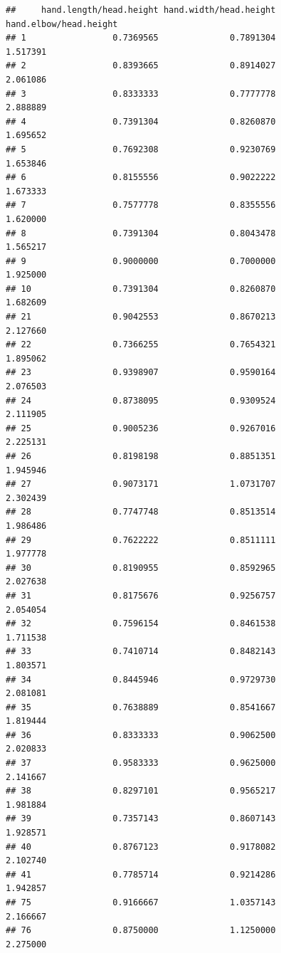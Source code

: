 \documentclass[]{article}
\begin{document}
\begin{verbatim}
##     hand.length/head.height hand.width/head.height hand.elbow/head.height
## 1                 0.7369565              0.7891304               1.517391
## 2                 0.8393665              0.8914027               2.061086
## 3                 0.8333333              0.7777778               2.888889
## 4                 0.7391304              0.8260870               1.695652
## 5                 0.7692308              0.9230769               1.653846
## 6                 0.8155556              0.9022222               1.673333
## 7                 0.7577778              0.8355556               1.620000
## 8                 0.7391304              0.8043478               1.565217
## 9                 0.9000000              0.7000000               1.925000
## 10                0.7391304              0.8260870               1.682609
## 21                0.9042553              0.8670213               2.127660
## 22                0.7366255              0.7654321               1.895062
## 23                0.9398907              0.9590164               2.076503
## 24                0.8738095              0.9309524               2.111905
## 25                0.9005236              0.9267016               2.225131
## 26                0.8198198              0.8851351               1.945946
## 27                0.9073171              1.0731707               2.302439
## 28                0.7747748              0.8513514               1.986486
## 29                0.7622222              0.8511111               1.977778
## 30                0.8190955              0.8592965               2.027638
## 31                0.8175676              0.9256757               2.054054
## 32                0.7596154              0.8461538               1.711538
## 33                0.7410714              0.8482143               1.803571
## 34                0.8445946              0.9729730               2.081081
## 35                0.7638889              0.8541667               1.819444
## 36                0.8333333              0.9062500               2.020833
## 37                0.9583333              0.9625000               2.141667
## 38                0.8297101              0.9565217               1.981884
## 39                0.7357143              0.8607143               1.928571
## 40                0.8767123              0.9178082               2.102740
## 41                0.7785714              0.9214286               1.942857
## 75                0.9166667              1.0357143               2.166667
## 76                0.8750000              1.1250000               2.275000

\end{verbatim}
\end{document}
